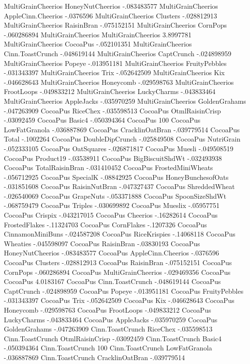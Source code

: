 MultiGrainCheerios	HoneyNutCheerios	-.083483577
MultiGrainCheerios	AppleCinn.Cheerios	-.0376596
MultiGrainCheerios	Clusters	-.028812913
MultiGrainCheerios	RaisinBran	-.075152151
MultiGrainCheerios	CornPops	-.060286894
MultiGrainCheerios	MultiGrainCheerios	3.8997781
MultiGrainCheerios	CocoaPus	-.052101351
MultiGrainCheerios	Cinn.ToastCrunch	-.048619144
MultiGrainCheerios	CaptCrunch	-.024898959
MultiGrainCheerios	Popeye	-.013951181
MultiGrainCheerios	FruityPebbles	-.031343397
MultiGrainCheerios	Trix	-.052642509
MultiGrainCheerios	Kix	-.046628643
MultiGrainCheerios	Honeycomb	-.029598763
MultiGrainCheerios	FrootLoops	-.049833212
MultiGrainCheerios	LuckyCharms	-.043833464
MultiGrainCheerios	AppleJacks	-.035970259
MultiGrainCheerios	GoldenGrahams	-.047263909
CocoaPus	RiceChex	-.035598513
CocoaPus	OtmlRaisinCrisp	-.03092459
CocoaPus	Basic4	-.050394364
CocoaPus	100%
CocoaPus	LowFatGranola	-.036887869
CocoaPus	CracklinOatBran	-.039779514
CocoaPus	Total	-.1002264
CocoaPus	DoubleDipCrunch	-.025849508
CocoaPus	NutriGrain	-.052333105
CocoaPus	OatSquares	-.026871817
CocoaPus	Muesli	-.049508519
CocoaPus	Product19	-.03538911
CocoaPus	BigBiscuitShdWt	-.032493938
CocoaPus	TotalRaisinBran	-.031410452
CocoaPus	FrostedMiniWheats	-.056712925
CocoaPus	SpecialK	-.08842925
CocoaPus	HoneyBunchesofOats	-.031851608
CocoaPus	RaisinNutBran	-.047327437
CocoaPus	ShreddedWheat	-.026540069
CocoaPus	GrapeNuts	-.053371888
CocoaPus	SpoonSizeShdWt	-.068759479
CocoaPus	Triples	-.030699892
CocoaPus	Mueslix	-.05957751
CocoaPus	Crispix	-.043217015
CocoaPus	Cheerios	-.16282614
CocoaPus	FrostedFlakes	-.11324703
CocoaPus	CornFlakes	-.1207326
CocoaPus	CinnamonMiniBuns	-.024587208
CocoaPus	RiceKrispies	-.14068118
CocoaPus	Wheaties	-.045598097
CocoaPus	RaisinBran	-.03830193
CocoaPus	HoneyNutCheerios	-.083483577
CocoaPus	AppleCinn.Cheerios	-.0376596
CocoaPus	Clusters	-.028812913
CocoaPus	RaisinBran	-.075152151
CocoaPus	CornPops	-.060286894
CocoaPus	MultiGrainCheerios	-.029469356
CocoaPus	CocoaPus	4.0183167
CocoaPus	Cinn.ToastCrunch	-.048619144
CocoaPus	CaptCrunch	-.024898959
CocoaPus	Popeye	-.013951181
CocoaPus	FruityPebbles	-.031343397
CocoaPus	Trix	-.052642509
CocoaPus	Kix	-.046628643
CocoaPus	Honeycomb	-.029598763
CocoaPus	FrootLoops	-.049833212
CocoaPus	LuckyCharms	-.043833464
CocoaPus	AppleJacks	-.035970259
CocoaPus	GoldenGrahams	-.047263909
Cinn.ToastCrunch	RiceChex	-.035598513
Cinn.ToastCrunch	OtmlRaisinCrisp	-.03092459
Cinn.ToastCrunch	Basic4	-.050394364
Cinn.ToastCrunch	100%
Cinn.ToastCrunch	LowFatGranola	-.036887869
Cinn.ToastCrunch	CracklinOatBran	-.039779514
